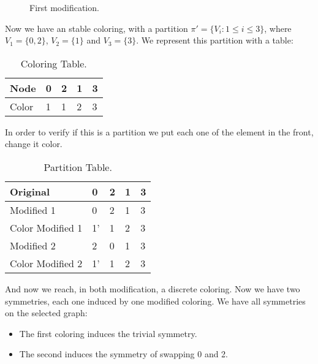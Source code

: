 \begin{example}
\begin{figure}[H]
  \caption{First modification.}
\end{figure}


Now we have an stable coloring, with a partition $\pi' = \{V_i: 1\le i\le 3\}$, where $V_1 = \{0,2\}$, $V_2 = \{1\}$ and $V_3 = \{3\}$. We represent this partition with a table:


\begin{table}[h]
  \begin{center}
    \begin{tabular}{|l|l|l|l|l|}
      \hline
      Node & 0 & 2 & 1 & 3 \\
      \hline
      Color & 1 & 1 & 2 & 3 \\
      \hline

    \end{tabular}
  \end{center}
  \caption{Coloring Table.}
\end{table}



In order to verify if this is a partition we put each one of the element in the front, change it color.

\begin{table}[h]
  \begin{center}
    \begin{tabular}{|l|l|l|l|l|}
      \hline
      Original & 0 & 2 & 1 & 3 \\
      \hline
      Modified 1 & 0 & 2 & 1 & 3 \\
      \hline
      Color Modified 1& 1'  & 1 & 2 & 3 \\
      \hline
      Modified 2 & 2 & 0 & 1 & 3 \\
      \hline
      Color Modified 2& 1'  & 1 & 2 & 3 \\
      \hline
    \end{tabular}
  \end{center}
  \caption{Partition Table.}
\end{table}

And now we reach, in both modification, a discrete coloring. Now we have two symmetries, each one induced by one modified coloring. We have all symmetries on the selected graph:
\begin{itemize}
\item The first coloring induces the trivial symmetry.
\item The second induces the symmetry of swapping 0 and 2.
\end{itemize}

\end{example}

